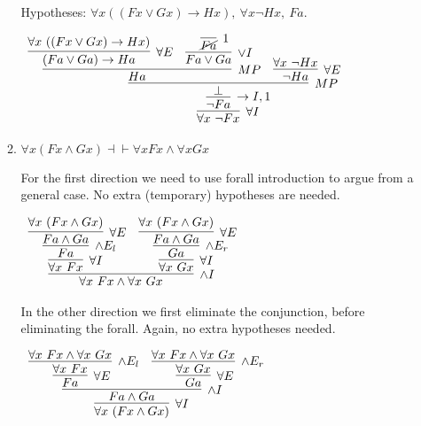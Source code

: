 \documentclass[11pt]{report}
\begin{document}
\begin{enumerate}
\begin{enumerate}
			Hypotheses: $\forall x ((Fx \lor Gx) \to Hx), \ \forall x \neg Hx, \ Fa$. 
			
				\begin{mdframed}
					\begin{center}
						$\begin{array}{c}
							\infer[\forall I]{\forall x \ \lnot Fx}
								{\infer[\to I,1]{\lnot Fa}
									{\infer[MP]{\bot}
										{\infer[MP]{Ha}
											{\infer[\forall E]{(Fa \lor Ga) \to Ha}{\forall x \ ((Fx \lor Gx) \to Hx)}
											&
											\infer[\lor I]{Fa \lor Ga}{\infer[1]{\cancel{Fa}}{}}}
										&
										\infer[\forall E]{\lnot Ha}
											{\forall x \ \lnot Hx}}}}							
						\end{array}$
					\end{center}
				\end{mdframed}

			\item $\forall x (Fx\land Gx) \dashv \vdash  \forall x Fx\land \forall x Gx$
			
			For the first direction we need to use forall introduction to argue from a general case. No extra (temporary) hypotheses are needed. 
			
				\begin{mdframed}
					\begin{center}
						$\begin{array}{c}
							\infer[\land I]{\forall x \ Fx \land \forall x \ Gx}
								{\infer[\forall I]{\forall x \ Fx}
									{\infer[\land E_{l}]{Fa}
										{\infer[\forall E]{Fa \land Ga}
											{\forall x \ (Fx \land Gx)}}}
								&
								\infer[\forall I]{\forall x \ Gx}
									{\infer[\land E_{r}]{Ga}
										{\infer[\forall E]{Fa \land Ga}
											{\forall x \ (Fx \land Gx)}}}}
						\end{array}$
					\end{center}
				\end{mdframed}

				In the other direction we first eliminate the conjunction, before eliminating the forall. Again, no extra hypotheses needed. 

				\begin{mdframed}
					\begin{center}
						$\begin{array}{c}
							\infer[\forall I]{\forall x \ (Fx \land Gx)}
								{\infer[\land I]{Fa \land Ga}
									{\infer[\forall E]{Fa}
										{\infer[\land E_{l}]{\forall x \ Fx}
											{\forall x \ Fx \land \forall x \ Gx}}
									&
									\infer[\forall E]{Ga}
										{\infer[\land E_{r}]{\forall x \ Gx}
											{\forall x \ Fx \land \forall x \ Gx}}}}
						\end{array}$
					\end{center}
				\end{mdframed}


\end{enumerate}
\end{enumerate}
\end{document}
